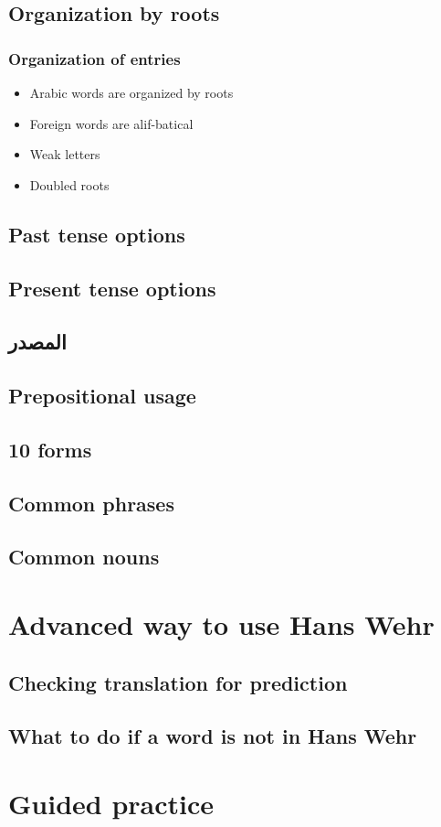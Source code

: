 \subsection{Organization by roots}
\subsubsection{Organization of entries}
\begin{itemize}	    \setlength{\itemsep}{5pt}
	\item Arabic words are organized by roots
	\item Foreign words are alif-batical
	\item Weak letters
	\item Doubled roots	
\end{itemize}
\subsection{Past tense options}
\subsection{Present tense options}
\subsection{\textarabic{المصدر}} %
\subsection{Prepositional usage}
\subsection{10 forms}
\subsection{Common phrases}
\subsection{Common nouns}


\section{Advanced way to use Hans Wehr}
\subsection{Checking translation for prediction}
\subsection{What to do if a word is not in Hans Wehr}
\section{Guided practice}

